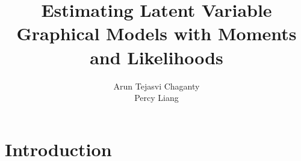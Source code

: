 \documentclass[xcolor={svgnames}]{beamer}
\title[Moments and Likelihoods (M58)]{Estimating Latent Variable Graphical Models with Moments and Likelihoods}
\author[Chaganty, Liang]{%
    Arun Tejasvi Chaganty\\
    Percy Liang
}
\institute{Stanford University}
\begin{document}
\begin{frame}
  \titlepage
\end{frame}

\section{Introduction}

% 
% 
% 
% 
% 
% 
% 
% 
\end{document}
